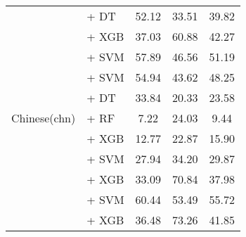 \begin{longtable}{p{4cm}p{6cm}ccc}
    \midrule
    \multirow{14}{*}{Chinese(chn)}        & \citep{li2024conanembeddinggeneraltextembedding} + DT                  & 52.12                                & 33.51              & 39.82             \\
                                          & \citep{li2024conanembeddinggeneraltextembedding} + XGB                 & 37.03                                & 60.88              & 42.27             \\
                                          & \citep{li2024conanembeddinggeneraltextembedding} + SVM                 & 57.89                                & 46.56              & 51.19             \\
                                          & \citep{wang2024multilingual} + SVM                                     & 54.94                                & 43.62              & 48.25             \\
                                          & \citep{zhang2024gme} + DT                                              & 33.84                                & 20.33              & 23.58             \\
                                          & \citep{zhang2024gme} + RF                                              & 7.22                                 & 24.03              & 9.44              \\
                                          & \citep{zhang2024gme} + XGB                                             & 12.77                                & 22.87              & 15.90             \\
                                          & \citep{zhang2024gme} + SVM                                             & 27.94                                & 34.20              & 29.87             \\
                                          & \citep{lier0072023xiaobuembeddingv2} + XGB                             & 33.09                                & 70.84              & 37.98             \\
                                          & \citep{lier0072023xiaobuembeddingv2} + SVM                             & 60.44                                & 53.49              & 55.72             \\
                                          & \citep{zpoint-large-embedding-zh} + XGB                                & 36.48                                & 73.26              & 41.85             \\

\end{longtable}
